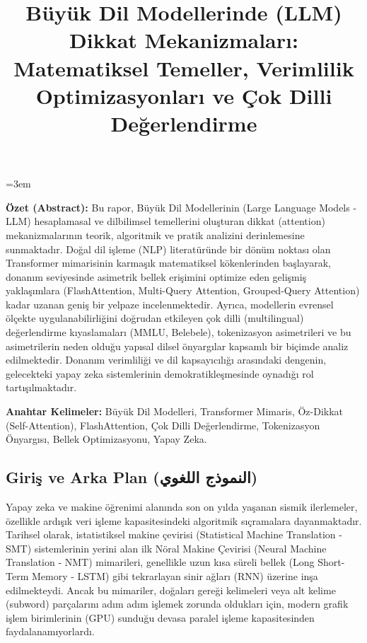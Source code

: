 \documentclass[11pt,a4paper]{article}
\begin{document}
\emergencystretch=3em

\title{Büyük Dil Modellerinde (LLM) Dikkat Mekanizmaları: Matematiksel Temeller, Verimlilik Optimizasyonları ve Çok Dilli Değerlendirme}
\author{}
\date{}
\maketitle

\textbf{Özet (Abstract):} Bu rapor, Büyük Dil Modellerinin (Large Language Models - LLM) hesaplamasal ve dilbilimsel temellerini oluşturan dikkat (attention) mekanizmalarının teorik, algoritmik ve pratik analizini derinlemesine sunmaktadır. Doğal dil işleme (NLP) literatüründe bir dönüm noktası olan Transformer mimarisinin karmaşık matematiksel kökenlerinden başlayarak, donanım seviyesinde asimetrik bellek erişimini optimize eden gelişmiş yaklaşımlara (FlashAttention, Multi-Query Attention, Grouped-Query Attention) kadar uzanan geniş bir yelpaze incelenmektedir. Ayrıca, modellerin evrensel ölçekte uygulanabilirliğini doğrudan etkileyen çok dilli (multilingual) değerlendirme kıyaslamaları (MMLU, Belebele), tokenizasyon asimetrileri ve bu asimetrilerin neden olduğu yapısal dilsel önyargılar kapsamlı bir biçimde analiz edilmektedir. Donanım verimliliği ve dil kapsayıcılığı arasındaki dengenin, gelecekteki yapay zeka sistemlerinin demokratikleşmesinde oynadığı rol tartışılmaktadır.

\textbf{Anahtar Kelimeler:} Büyük Dil Modelleri, Transformer Mimaris, Öz-Dikkat (Self-Attention), FlashAttention, Çok Dilli Değerlendirme, Tokenizasyon Önyargısı, Bellek Optimizasyonu, Yapay Zeka.

\subsection{Giriş ve Arka Plan (النموذج اللغوي)}
Yapay zeka ve makine öğrenimi alanında son on yılda yaşanan sismik ilerlemeler, özellikle ardışık veri işleme kapasitesindeki algoritmik sıçramalara dayanmaktadır. Tarihsel olarak, istatistiksel makine çevirisi (Statistical Machine Translation - SMT) sistemlerinin yerini alan ilk Nöral Makine Çevirisi (Neural Machine Translation - NMT) mimarileri, genellikle uzun kısa süreli bellek (Long Short-Term Memory - LSTM) gibi tekrarlayan sinir ağları (RNN) üzerine inşa edilmekteydi. Ancak bu mimariler, doğaları gereği kelimeleri veya alt kelime (subword) parçalarını adım adım işlemek zorunda oldukları için, modern grafik işlem birimlerinin (GPU) sunduğu devasa paralel işleme kapasitesinden faydalanamıyorlardı.
\end{document}
